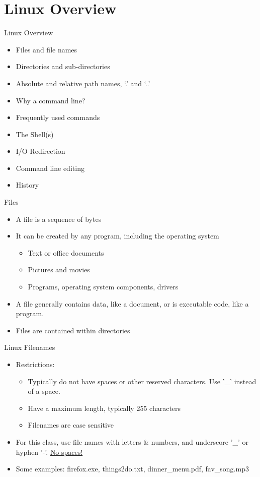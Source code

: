 \documentclass[graphics]{beamer}
\begin{document}
\section*{Linux Overview}
\begin{frame}{Linux Overview}
    \begin{itemize}
        \item Files and file names
        \item Directories and sub-directories
        \item Absolute and relative path names, `.' and `..'
        \item Why a command line?
        \item Frequently used commands
        \item The Shell(s)
        \item I/O Redirection
        \item Command line editing
        \item History
    \end{itemize}
\end{frame}

\begin{frame}{Files}
    \begin{itemize}
        \item A file is a sequence of bytes
        \item It can be created by any program, including the operating system
        \begin{itemize}
            \item Text or office documents
            \item Pictures and movies
            \item Programs, operating system components, drivers
        \end{itemize}
        \item A file generally contains data, like a document, or is executable code, like a program.
        \item Files are contained within directories
    \end{itemize}
\end{frame}

\begin{frame}{Linux Filenames}
    \begin{itemize}
        \item Restrictions:
        \begin{itemize}
            \item Typically do not have spaces or other reserved characters. Use '\_' instead of a space.
            \item Have a maximum length, typically 255 characters
            \item Filenames are case sensitive
        \end{itemize}
        \item For this class, use file names with letters \& numbers, and underscore '\_' or hyphen '-'. \underline{No spaces!}
        \item Some examples: firefox.exe, things2do.txt, dinner\_menu.pdf, fav\_song.mp3
    \end{itemize}
\end{frame}
\end{document}
